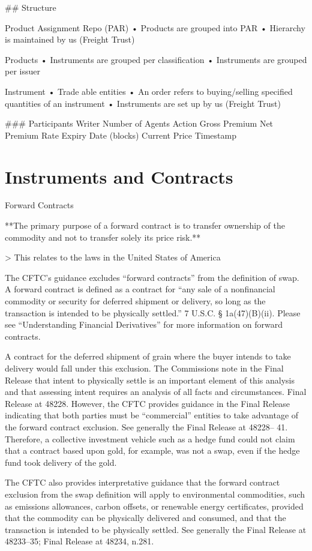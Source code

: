 \documentclass{article}
\begin{document}
## Structure 

Product Assignment Repo (PAR)
• Products are grouped into PAR
• Hierarchy is maintained by us (Freight Trust)

Products
• Instruments are grouped per classification 
• Instruments are grouped per issuer

Instrument
• Trade able entities
• An order refers to buying/selling specified quantities of an instrument
• Instruments are set up by us (Freight Trust)

### Participants 
Writer
Number of Agents
Action
Gross Premium
Net Premium
Rate
Expiry Date (blocks)
Current Price
Timestamp

\section{Instruments and Contracts } 



 Forward Contracts

**The primary purpose of a forward contract is to transfer ownership of the
commodity and not to transfer solely its price risk.**



> This relates to the laws in the United States of America


The CFTC's guidance excludes “forward contracts” from the definition of swap. A
forward contract is defined as a contract for “any sale of a nonfinancial commodity or security
for deferred shipment or delivery, so long as the transaction is intended to be physically
settled.” 7 U.S.C. § 1a(47)(B)(ii). Please see “Understanding Financial Derivatives” for more
information on forward contracts.

A contract for the deferred shipment of grain where the buyer intends to take delivery would
fall under this exclusion. The Commissions note in the Final Release that intent to physically
settle is an important element of this analysis and that assessing intent requires an analysis
of all facts and circumstances. Final Release at 48228. However, the CFTC provides
guidance in the Final Release indicating that both parties must be “commercial” entities to
take advantage of the forward contract exclusion. See generally the Final Release at 48228–
41. Therefore, a collective investment vehicle such as a hedge fund could not claim that a
contract based upon gold, for example, was not a swap, even if the hedge fund took delivery
of the gold.

The CFTC also provides interpretative guidance that the forward contract exclusion from the
swap definition will apply to environmental commodities, such as emissions allowances,
carbon offsets, or renewable energy certificates, provided that the commodity can be
physically delivered and consumed, and that the transaction is intended to be physically
settled. See generally the Final Release at 48233–35; Final Release at 48234, n.281.
\end{document}
